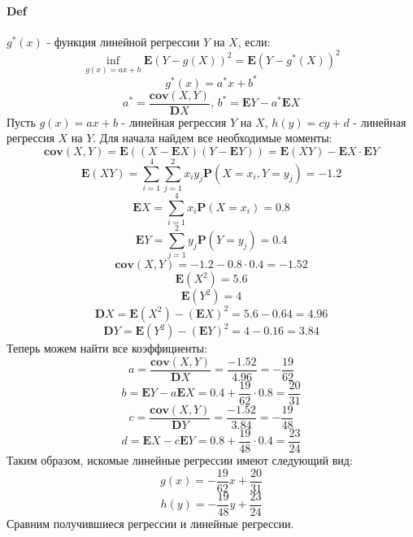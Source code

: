\documentclass[fleqn, 10pt]{article}
\begin{document}
\paragraph{Def} \(g^{*}(x)\) - функция линейной регрессии \(Y\) на \(X\), если:
\[\inf\limits_{g(x)=ax+b}{\textbf{E}(Y-g(X))^2} = \textbf{E}(Y-g^{*}(X))^2\]
\[g^{*}(x) = a^{*}x+b^{*}\]
\[a^{*} = \frac{\textbf{cov}(X,Y)}{\textbf{D}X}\text{, } b^{*} = \textbf{E}Y - a^{*}\textbf{E}X\]
Пусть \(g(x) = ax + b\) - линейная регрессия \(Y\) на \(X\), \(h(y) = cy + d\) - линейная регрессия \(X\) на \(Y\). Для начала найдем все необходимые моменты:
\[\textbf{cov}(X,Y) = \textbf{E}((X-\textbf{E}X)(Y-\textbf{E}Y)) = \textbf{E}(XY) - \textbf{E}X\cdot\textbf{E}Y\]
\[\textbf{E}(XY) = \sum\limits_{i=1}^{4}{\sum\limits_{j=1}^{2}{x_iy_j\textbf{P}(X=x_i,Y=y_j)}} = -1.2\]
\[\textbf{E}X = \sum\limits_{i=1}^4{x_i\textbf{P}(X=x_i)} = 0.8\]
\[\textbf{E}Y = \sum\limits_{j=1}^2{y_j\textbf{P}(Y=y_j)} = 0.4\]
\[\textbf{cov}(X,Y) = -1.2 - 0.8\cdot0.4 = -1.52\]
\[\textbf{E}(X^2) = 5.6\]
\[\textbf{E}(Y^2) = 4\]
\[\textbf{D}X = \textbf{E}(X^2) - (\textbf{E}X)^2 = 5.6 - 0.64 = 4.96\]
\[\textbf{D}Y = \textbf{E}(Y^2) - (\textbf{E}Y)^2 = 4 - 0.16 = 3.84\]
Теперь можем найти все коэффициенты:
\[a = \frac{\textbf{cov}(X, Y)}{\textbf{D}X} = \frac{-1.52}{4.96} = -\frac{19}{62}\]
\[b = \textbf{E}Y - a\textbf{E}X = 0.4 + \frac{19}{62}\cdot0.8 = \frac{20}{31}\]
\[c = \frac{\textbf{cov}(X, Y)}{\textbf{D}Y} = \frac{-1.52}{3.84} = -\frac{19}{48}\]
\[d = \textbf{E}X - c\textbf{E}Y = 0.8  + \frac{19}{48}\cdot0.4 = \frac{23}{24}\]
Таким образом, искомые линейные регрессии имеют следующий вид:
\[g(x) = -\frac{19}{62}x+\frac{20}{31}\]
\[h(y) = -\frac{19}{48}y + \frac{23}{24}\]
Сравним получившиеся регрессии и линейные регрессии.

\begin{center}
\end{center}

\begin{center}
\end{center}
\end{document}
